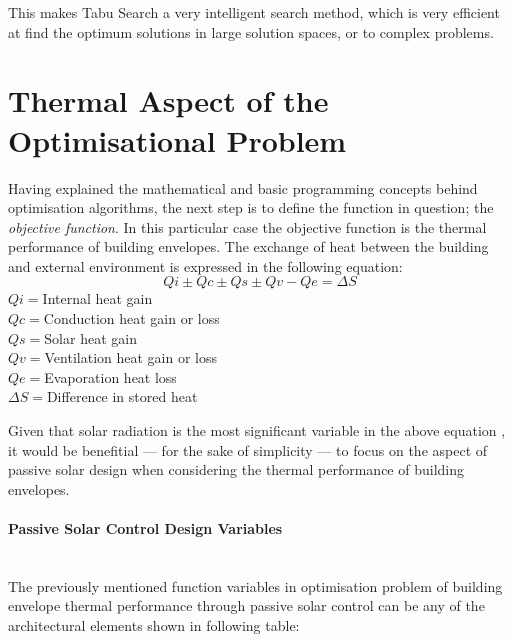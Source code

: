 \documentclass[11pt,a4paper,oneside]{article}
\begin{document}
\begin{multicols}{2}
	This makes Tabu Search a very intelligent search method, which is very efficient at find the optimum solutions in large solution spaces, or to complex problems.

\section{Thermal Aspect of the Optimisational Problem}

Having explained the mathematical and basic programming concepts behind optimisation algorithms, the next step is to define the function in question; the \emph{objective function}. In this particular case the objective function is the thermal performance of building envelopes. The exchange of heat between the building and external environment is expressed in the following equation:
\begin{equation}
	Qi\pm Qc\pm Qs\pm Qv-Qe=\Delta S
\end{equation}
\footnotesize
\indent$Qi=$Internal heat gain\\
\indent$Qc=$Conduction heat gain or loss\\
\indent$Qs=$Solar heat gain\\
\indent$Qv=$Ventilation heat gain or loss\\
\indent$Qe=$Evaporation heat loss\\
\indent$\Delta S=$Difference in stored heat\\
\normalsize

Given that solar radiation is the most significant variable in the above equation \cite{szokolay08}, it would be benefitial --- for the sake of simplicity --- to focus on the aspect of passive solar design when considering the thermal performance of building envelopes.

\paragraph{Passive Solar Control Design Variables}\mbox{}\\

The previously mentioned function variables in optimisation problem of building envelope thermal performance through passive solar control can be any of the architectural elements shown in following table:


\end{multicols}
\end{document}

